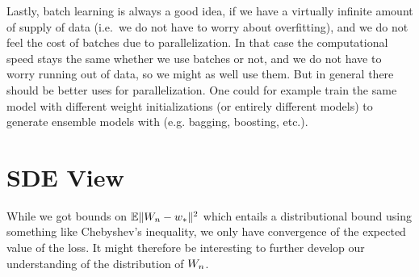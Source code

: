 Lastly, batch learning is always a good idea, if we have a virtually infinite
amount of supply of data (i.e.\ we do not have to worry about overfitting), and
we do not feel the cost of batches due to parallelization. In that case the
computational speed stays the same whether we use batches or not, and we do not
have to worry running out of data, so we might as well use them. But in general
there should be better uses for parallelization. One could for example train
the same model with different weight initializations (or entirely different
models) to generate ensemble models with (e.g. bagging, boosting, etc.).

\section{SDE View}

While we got bounds on \(\mathbb{E}\|W_n - w_*\|^2\) which entails a
distributional bound using something like Chebyshev's inequality, we only
have convergence of the expected value of the loss. It might therefore be
interesting to further develop our understanding of the distribution of \(W_n\).

